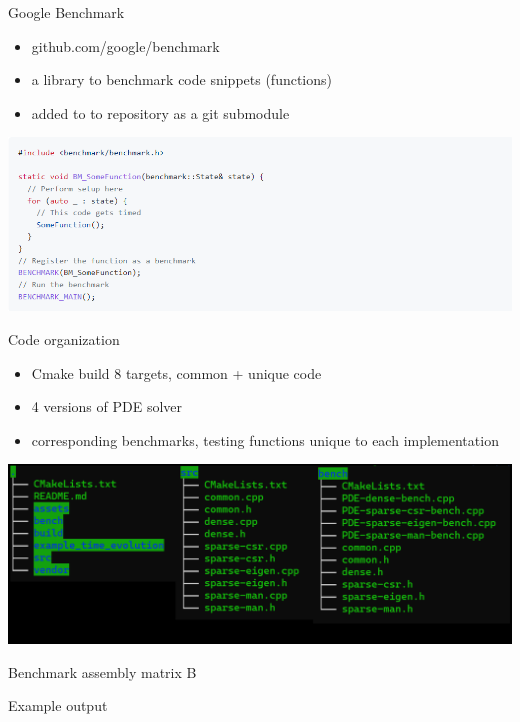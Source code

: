\documentclass[aspectratio=169,xcolor=dvipsnames]{beamer}
\begin{document}
\begin{frame}{Google Benchmark}
    \begin{itemize}
        \item github.com/google/benchmark
        \item a library to benchmark code snippets (functions) 
        \item added to to repository as a git submodule
    \end{itemize}
    
    \begin{center}
    \includegraphics[width=0.8\linewidth]{example_google_benchmark.png}
    \end{center}
\end{frame}


\begin{frame}{Code organization}
    \begin{itemize}
        \item Cmake build 8 targets, common + unique code
        \item 4 versions of PDE solver
        \item corresponding benchmarks, testing functions unique to each implementation 
    \end{itemize}
    
    \begin{center}
    \includegraphics[width=0.8\linewidth]{code_structure.png}
    \end{center}
\end{frame}


\begin{frame}{Benchmark assembly matrix B}
   
   Example output
   
\end{frame}
\end{document}
